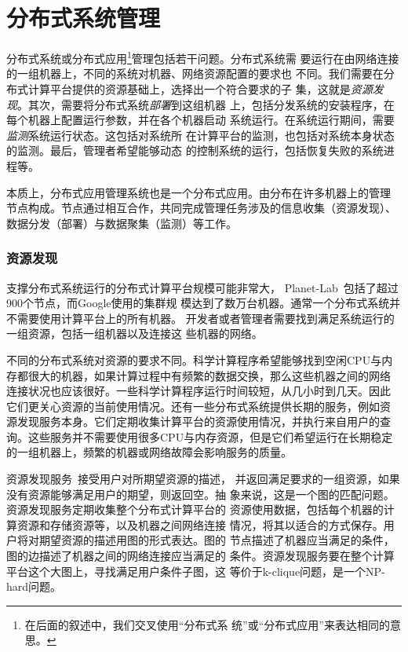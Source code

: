 \section{分布式系统管理}
\label{sec:intro_mgmt}

分布式系统或分布式应用\footnote{在后面的叙述中，我们交叉使用“分布式系
统”或“分布式应用”来表达相同的意思。}管理包括若干问题。分布式系统需
要运行在由网络连接的一组机器上，不同的系统对机器、网络资源配置的要求也
不同。我们需要在分布式计算平台提供的资源基础上，选择出一个符合要求的子
集，这就是\emph{资源发现}。其次，需要将分布式系统\emph{部署}到这组机器
上，包括分发系统的安装程序，在每个机器上配置运行参数，并在各个机器启动
系统运行。在系统运行期间，需要\emph{监测}系统运行状态。这包括对系统所
在计算平台的监测，也包括对系统本身状态的监测。最后，管理者希望能够动态
的控制系统的运行，包括恢复失败的系统进程等。

本质上，分布式应用管理系统也是一个分布式应用。由分布在许多机器上的管理
节点构成。节点通过相互合作，共同完成管理任务涉及的信息收集（资源发现）、
数据分发（部署）与数据聚集（监测）等工作。

\subsubsection*{资源发现}

支撑分布式系统运行的分布式计算平台规模可能非常大，
Planet-Lab~\cite{Bavier2004}包括了超过900个节点，而Google使用的集群规
模达到了数万台机器。通常一个分布式系统并不需要使用计算平台上的所有机器。
开发者或者管理者需要找到满足系统运行的一组资源，包括一组机器以及连接这
些机器的网络。

不同的分布式系统对资源的要求不同。科学计算程序希望能够找到空闲CPU与内
存都很大的机器，如果计算过程中有频繁的数据交换，那么这些机器之间的网络
连接状况也应该很好。一些科学计算程序运行时间较短，从几小时到几天。因此
它们更关心资源的当前使用情况。还有一些分布式系统提供长期的服务，例如资
源发现服务本身。它们定期收集计算平台的资源使用情况，并执行来自用户的查
询。这些服务并不需要使用很多CPU与内存资源，但是它们希望运行在长期稳定
的一组机器上，频繁的机器或网络故障会影响服务的质量。

资源发现服务~\cite{sword_toit, xenosearch}接受用户对所期望资源的描述，
并返回满足要求的一组资源，如果没有资源能够满足用户的期望，则返回空。抽
象来说，这是一个图的匹配问题。资源发现服务定期收集整个分布式计算平台的
资源使用数据，包括每个机器的计算资源和存储资源等，以及机器之间网络连接
情况，将其以适合的方式保存。用户将对期望资源的描述用图的形式表达。图的
节点描述了机器应当满足的条件，图的边描述了机器之间的网络连接应当满足的
条件。资源发现服务要在整个计算平台这个大图上，寻找满足用户条件子图，这
等价于k-clique问题，是一个NP-hard问题。

